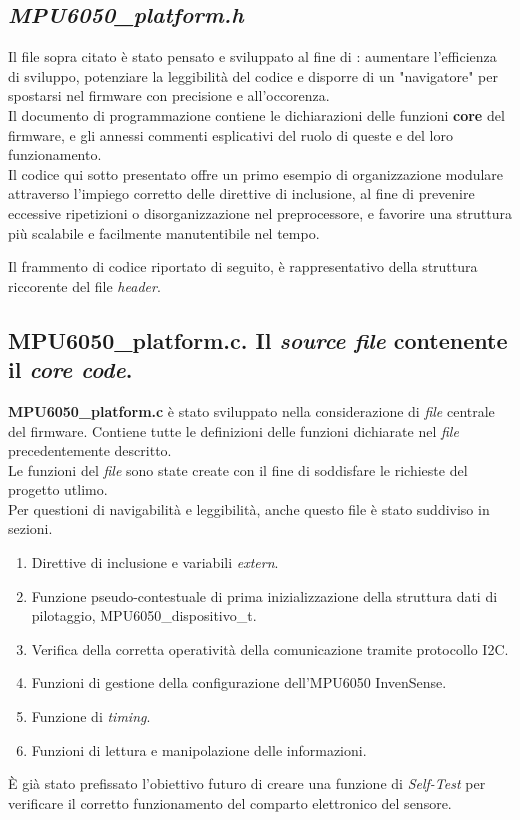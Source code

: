 \documentclass[11pt]{report}
\begin{document}
\subsection{\textit{MPU6050\_platform.h}}
Il file sopra citato è stato pensato e sviluppato al fine di : aumentare l'efficienza di sviluppo, potenziare la leggibilità del codice e disporre di un "navigatore" per spostarsi nel firmware con precisione e all'occorenza.\\
Il documento di programmazione contiene le dichiarazioni delle funzioni \textbf{core} del firmware, e gli annessi commenti esplicativi del ruolo di queste e del loro funzionamento.\\
Il codice qui sotto presentato offre un primo esempio di organizzazione modulare attraverso l'impiego corretto delle direttive di inclusione, al fine di prevenire eccessive ripetizioni o disorganizzazione nel preprocessore, e favorire una struttura più scalabile e facilmente manutentibile nel tempo.

Il frammento di codice riportato di seguito, è rappresentativo della struttura riccorente del file \textit{header}.
\newpage

\newpage
\subsection{MPU6050\_platform.c. Il \textit{source file} contenente il \textit{core code}.}
\textbf{MPU6050\_platform.c} è stato sviluppato nella considerazione di \textit{file} centrale del firmware. Contiene tutte le definizioni delle funzioni dichiarate nel \textit{file} precedentemente descritto.\\
Le funzioni del \textit{file} sono state create con il fine di soddisfare le richieste del progetto utlimo.\\
Per questioni di navigabilità e leggibilità, anche questo file è stato suddiviso in sezioni.\\
\begin{enumerate}
    \item Direttive di inclusione e variabili \textit{extern}.
    \item Funzione pseudo-contestuale di prima inizializzazione della struttura dati di pilotaggio, MPU6050\_dispositivo\_t.
    \item Verifica della corretta operatività della comunicazione tramite protocollo I2C.
    \item Funzioni di gestione della configurazione dell'MPU6050 InvenSense.
    \item Funzione di \textit{timing}.
    \item Funzioni di lettura e manipolazione delle informazioni.
\end{enumerate}
È già stato prefissato l'obiettivo futuro di creare una funzione di \textit{Self-Test} per verificare il corretto funzionamento del comparto elettronico del sensore.
\end{document}
